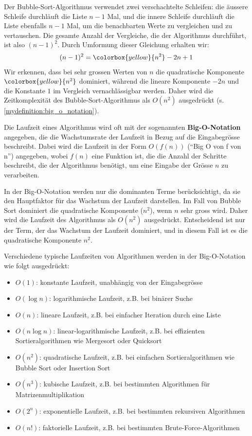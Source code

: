 Der Bubble-Sort-Algorithmus verwendet zwei verschachtelte Schleifen: die äussere Schleife durchläuft die Liste $n-1$ Mal, und die innere Schleife durchläuft die Liste ebenfalls $n-1$ Mal, um die benachbarten Werte zu vergleichen und zu vertauschen. Die gesamte Anzahl der Vergleiche, die der Algorithmus durchführt, ist also $(n-1)^2$. Durch Umformung dieser Gleichung erhalten wir:
\[(n-1)^2=\colorbox{yellow}{\ensuremath{n^2}}-2n+1\]
Wir erkennen, dass bei sehr grossen Werten von $n$ die quadratische Komponente $\colorbox{yellow}{\ensuremath{n^2}}$ dominiert, während die lineare Komponente $-2n$ und die Konstante $1$ im Vergleich vernachlässigbar werden. Daher wird die Zeitkomplexität des Bubble-Sort-Algorithmus als $O(n^2)$ ausgedrückt (s. \cref{mydefinition:big_o_notation}).

\begin{mydefinition}
	\label{mydefinition:big_o_notation}
	Die Laufzeit eines Algorithmus wird oft mit der sogenannten \textbf{Big-O-Notation} angegeben, die die Wachstumsrate der Laufzeit in Bezug auf die Eingabegrösse beschreibt. Dabei wird die Laufzeit in der Form $O(f(n))$ (\enquote{Big O von f von n}) angegeben, wobei $f(n)$ eine Funktion ist, die die Anzahl der Schritte beschreibt, die der Algorithmus benötigt, um eine Eingabe der Grösse $n$ zu verarbeiten.

	In der Big-O-Notation werden nur die dominanten Terme berücksichtigt, da sie den Hauptfaktor für das Wachstum der Laufzeit darstellen. Im Fall von Bubble Sort dominiert die quadratische Komponente ($n^2$), wenn $n$ sehr gross wird. Daher wird die Laufzeit des Algorithmus als $O(n^2)$ ausgedrückt. Entscheidend ist nur der Term, der das Wachstum der Laufzeit dominiert, und in diesem Fall ist es die quadratische Komponente $n^2$.

	Verschiedene typische Laufzeiten von Algorithmen werden in der Big-O-Notation wie folgt ausgedrückt:
	\begin{itemize}
		\item $O(1)$: konstante Laufzeit, unabhängig von der Eingabegrösse
		\item $O(\log n)$: logarithmische Laufzeit, z.B. bei binärer Suche
		\item $O(n)$: lineare Laufzeit, z.B. bei einfacher Iteration durch eine Liste
		\item $O(n \log n)$: linear-logarithmische Laufzeit, z.B. bei effizienten Sortieralgorithmen wie Mergesort oder Quicksort
		\item $O(n^2)$: quadratische Laufzeit, z.B. bei einfachen Sortieralgorithmen wie Bubble Sort oder Insertion Sort
		\item $O(n^3)$: kubische Laufzeit, z.B. bei bestimmten Algorithmen für Matrizenmultiplikation
		\item $O(2^n)$: exponentielle Laufzeit, z.B. bei bestimmten rekursiven Algorithmen
		\item $O(n!)$: faktorielle Laufzeit, z.B. bei bestimmten Brute-Force-Algorithmen
	\end{itemize}


\end{mydefinition}
